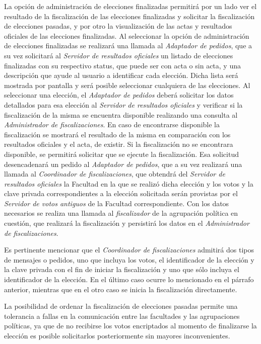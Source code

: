 La opción de administración de elecciones finalizadas permitirá por un lado ver el resultado de la fiscalización de las elecciones finalizadas y solicitar la fiscalización de elecciones pasadas, y por otro la visualización de las actas y resultados oficiales de las elecciones finalizadas. Al seleccionar la opción de administración de elecciones finalizadas se realizará una llamada al \emph{Adaptador de pedidos}, que a su vez solicitará al \emph{Servidor de resultados oficiales} un listado de elecciones finalizadas con su respectivo status, que puede ser con acta o sin acta, y una descripción que ayude al usuario a identificar cada elección. Dicha lista será mostrada por pantalla y será posible seleccionar cualquiera de las elecciones. Al seleccionar una elección, el \emph{Adaptador de pedidos} deberá solicitar los datos detallados para esa elección al \emph{Servidor de resultados oficiales} y verificar si la fiscalización de la misma se encuentra disponible realizando una consulta al \emph{Administrador de fiscalizaciones}. En caso de encontrarse disponible la fiscalización se mostrará el resultado de la misma en comparación con los resultados oficiales y el acta, de existir. Si la fiscalización no se encontrara disponible, se permitirá solicitar que se ejecute la fiscalización. Esa solicitud desencadenará un pedido al \emph{Adaptador de pedidos}, que a su vez realizará una llamada al \emph{Coordinador de fiscalizaciones}, que obtendrá del \emph{Servidor de resultados oficiales} la Facultad en la que se realizó dicha elección y los votos y la clave privada correspondientes a la elección solicitada serán provistas por el \emph{Servidor de votos antiguos} de la Facultad correspondiente. Con los datos necesarios se realiza una llamada al \emph{fiscalizador} de la agrupación política en cuestión, que realizará la fiscalización y persistirá los datos en el \emph{Administrador de fiscalizaciones}.

Es pertinente mencionar que el \emph{Coordinador de fiscalizaciones} admitirá dos tipos de mensajes o pedidos, uno que incluya los votos, el identificador de la elección y la clave privada con el fin de iniciar la fiscalización y uno que sólo incluya el identificador de la elección. En el último caso ocurre lo mencionado en el párrafo anterior, mientras que en el otro caso se inicia la fiscalización directamente. 


La posibilidad de ordenar la fiscalización de elecciones pasadas permite una tolerancia a fallas en la comunicación entre las facultades y las agrupaciones políticas, ya que de no recibirse los votos encriptados al momento de finalizarse la elección es posible solicitarlos posteriormente sin mayores inconvenientes.



